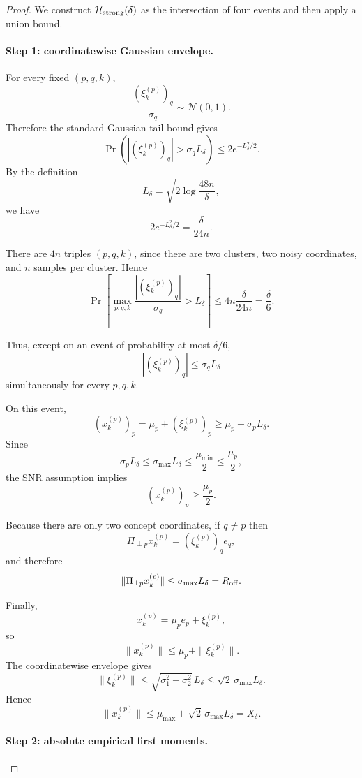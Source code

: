 \documentclass{article} %
\theoremstyle{plain}
\theoremstyle{definition}
\theoremstyle{remark}
\begin{document}
\begin{proof}
We construct $\mathcal H_{\rm strong}(\delta)$ as the intersection of
four events and then apply a union bound.

\paragraph{Step 1: coordinatewise Gaussian envelope.}

For every fixed $(p,q,k)$,
\[
\frac{(\xi_k^{(p)})_q}{\sigma_q}
\sim
\mathcal N(0,1).
\]
Therefore the standard Gaussian tail bound gives
\[
\Pr\!\left(
|(\xi_k^{(p)})_q|
>
\sigma_qL_\delta
\right)
\le
2e^{-L_\delta^2/2}.
\]
By the definition
\[
L_\delta
=
\sqrt{2\log\frac{48n}{\delta}},
\]
we have
\[
2e^{-L_\delta^2/2}
=
\frac{\delta}{24n}.
\]

There are $4n$ triples $(p,q,k)$, since there are two clusters,
two noisy coordinates, and $n$ samples per cluster. Hence
\[
\Pr\!\left[
\max_{p,q,k}
\frac{|(\xi_k^{(p)})_q|}{\sigma_q}
>
L_\delta
\right]
\le
4n\frac{\delta}{24n}
=
\frac{\delta}{6}.
\]

Thus, except on an event of probability at most $\delta/6$,
\[
|(\xi_k^{(p)})_q|
\le
\sigma_qL_\delta
\]
simultaneously for every $p,q,k$.

On this event,
\[
(x_k^{(p)})_p
=
\mu_p+(\xi_k^{(p)})_p
\ge
\mu_p-\sigma_pL_\delta.
\]
Since
\[
\sigma_pL_\delta
\le
\sigma_{\max}L_\delta
\le
\frac{\mu_{\min}}2
\le
\frac{\mu_p}{2},
\]
the SNR assumption implies
\[
(x_k^{(p)})_p
\ge
\frac{\mu_p}{2}.
\]

Because there are only two concept coordinates, if $q\neq p$ then
\[
\Pi_{\perp p}x_k^{(p)}
=
(\xi_k^{(p)})_q e_q,
\]
and therefore
\[
\|\Pi_{\perp p}x_k^{(p)}\|
\le
\sigma_{\max}L_\delta
=
R_{\rm off}.
\]

Finally,
\[
x_k^{(p)}
=
\mu_pe_p+\xi_k^{(p)},
\]
so
\[
\|x_k^{(p)}\|
\le
\mu_p+\|\xi_k^{(p)}\|.
\]
The coordinatewise envelope gives
\[
\|\xi_k^{(p)}\|
\le
\sqrt{
\sigma_1^2+\sigma_2^2
}\,L_\delta
\le
\sqrt2\,\sigma_{\max}L_\delta.
\]
Hence
\[
\|x_k^{(p)}\|
\le
\mu_{\max}
+
\sqrt2\,\sigma_{\max}L_\delta
=
X_\delta.
\]

\paragraph{Step 2: absolute empirical first moments.}


\end{proof}
\end{document}
